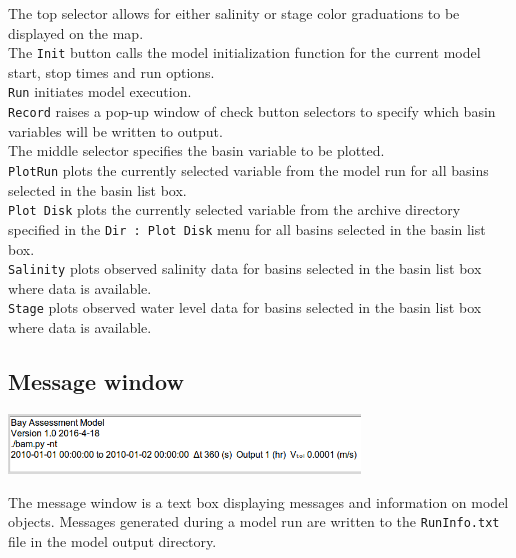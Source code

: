 \begin{minipage}[t]{0.7\textwidth}
  \noindent
  
The top selector allows for either salinity or stage color graduations to be displayed on the map.\\

The \texttt{Init} button calls the model initialization function for the current model start, stop times and run options.\\

\texttt{Run} initiates model execution. \\

\texttt{Record} raises a pop-up window of check button selectors to specify which basin variables will be written to output.\\

The middle selector specifies the basin variable to be plotted. \\

\texttt{PlotRun} plots the currently selected variable from the model run for all basins selected in the basin list box.\\

\texttt{Plot Disk} plots the currently selected variable from the archive directory specified in the \texttt{Dir : Plot Disk} menu for all basins selected in the basin list box.\\

\texttt{Salinity} plots observed salinity data for basins selected in the basin list box where data is available.\\

\texttt{Stage} plots observed water level data for basins selected in the basin list box where data is available.
\end{minipage}

\subsection{Message window}
\label{sec:Message window}
\includegraphics[width=0.7\textwidth]{graphics/MessageBox.png}

The message window is a text box displaying messages and information on model objects.  Messages generated during a model run are written to the \texttt{RunInfo.txt} file in the model output directory. 

